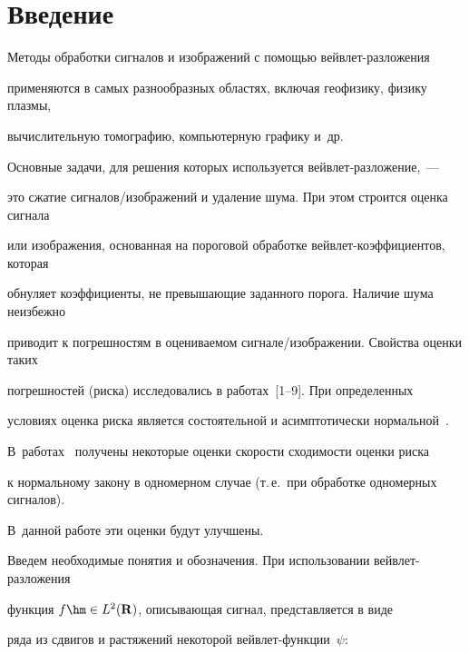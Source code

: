       \thispagestyle{headings}



      

            \label{st\stat}

            

            \vspace*{-12pt}





\section{Введение}



Методы обработки сигналов и изображений с помощью вейв\-лет-раз\-ло\-же\-ния 

применяются в самых разнообразных областях, включая геофизику, физику плазмы, 

вычислительную томографию, компьютерную графику и~др. 

Основные задачи, для решения которых используется вейв\-лет-раз\-ло\-же\-ние,~--- 

это сжатие сиг\-на\-лов/изображений и удаление шума. При этом строится оценка сигнала 

или изображения, основанная на пороговой обработке вейвлет-коэффициентов, которая 

обнуляет коэффициенты, не превышающие заданного порога. Наличие шума неизбежно 

приводит к погрешностям в оцениваемом сиг\-на\-ле/изоб\-ра\-же\-нии. Свойства оценки таких 

погрешностей (риска) исследовались в работах~[1--9]. При определенных 

условиях оценка риска является состоятельной и асимптотически нормальной~\cite{7sh}. 

В~работах~\cite{8sh, 9sh} получены некоторые оценки скорости сходимости оценки риска 

к нормальному закону в одномерном случае (т.\,е.\ при обработке одномерных сигналов). 

В~данной работе эти оценки будут улучшены.



Введем необходимые понятия и обозначения. При использовании вейв\-лет-раз\-ло\-же\-ния 

функция $f\hm\in L^2(\mathbf{R})$, описывающая сигнал, представляется в виде 

ряда из сдвигов и растяжений некоторой вейвлет-функции~$\psi$:



